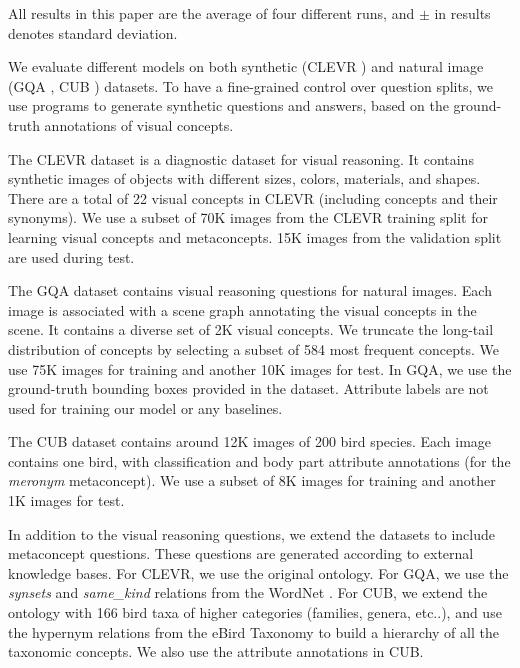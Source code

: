 \documentclass{article}
\makeatletter
\def\vs{{\bm{s}}}
\DeclareRobustCommand\onedot{\futurelet\@let@token\@onedot}
\def\@onedot{\ifx\@let@token.\else.\null\fi\xspace}
\def\etc{etc\onedot} \def\vs{\emph{vs}\onedot}
\makeatother
\begin{document}
All results in this paper are the average of four different runs, and $\pm$ in results denotes standard deviation.


\label{sec:exp:dataset}
We evaluate different models on both synthetic (CLEVR \citep{Johnson2017CLEVR}) and natural image (GQA \citep{Hudson2019GQA}, CUB \citep{CUB_200_2011}) datasets. To have a fine-grained control over question splits, we use programs to generate synthetic questions and answers, based on the ground-truth annotations of visual concepts.

The CLEVR dataset \citep{Johnson2017CLEVR} is a diagnostic dataset for visual reasoning. It contains synthetic images of objects with different sizes, colors, materials, and shapes. There are a total of 22 visual concepts in CLEVR (including concepts and their synonyms). We use a subset of 70K images from the CLEVR training split for learning visual concepts and metaconcepts. 15K images from the validation split are used during test.

The GQA dataset \citep{Hudson2019GQA} contains visual reasoning questions for natural images. Each image is associated with a scene graph annotating the visual concepts in the scene. It contains a diverse set of 2K visual concepts. We truncate the long-tail distribution of concepts by selecting a subset of 584 most frequent concepts. We use 75K images for training and another 10K images for test. In GQA, we use the ground-truth bounding boxes provided in the dataset. Attribute labels are not used for training our model or any baselines.

The CUB dataset \citep{CUB_200_2011} contains around 12K images of 200 bird species. Each image contains one bird, with classification and body part attribute annotations (for the {\it meronym} metaconcept). We use a subset of 8K images for training and another 1K images for test.



In addition to the visual reasoning questions, we extend the datasets to include metaconcept questions. These questions are generated according to external knowledge bases. For CLEVR, we use the original ontology. For GQA, we use the {\it synsets} and {\it same\_kind} relations from the WordNet \citep{Miller1995Wordnet}. For CUB, we extend the ontology with 166 bird taxa of higher categories (families, genera, \etc ), and use the hypernym relations from the eBird Taxonomy \citep{Sullivan2009eBird} to build a hierarchy of all the taxonomic concepts. We also use the attribute annotations in CUB.
\end{document}
